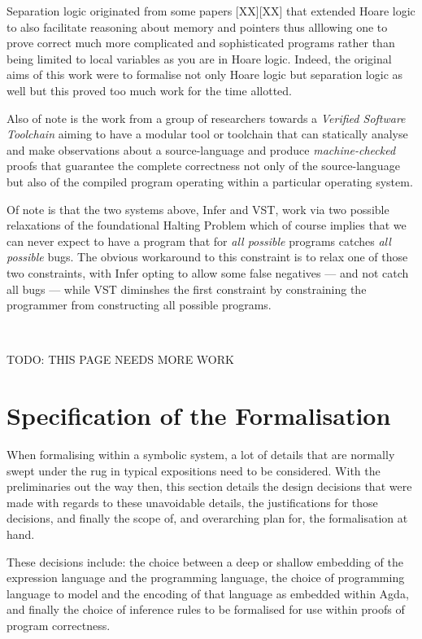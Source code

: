 \documentclass[oneside,12pt]{article}
\begin{document}
Separation logic originated from some papers [XX][XX] that extended Hoare logic to also facilitate reasoning about memory and pointers thus alllowing one to prove correct much more complicated and sophisticated programs rather than being limited to local variables as you are in Hoare logic. Indeed, the original aims of this work were to formalise not only Hoare logic but separation logic as well but this proved too much work for the time allotted.


Also of note is the work from a group of researchers towards a \emph{Verified Software Toolchain}\cite{vst} aiming to have a modular tool or toolchain that can statically analyse and make observations about a source-language and produce \emph{machine-checked} proofs that guarantee the complete correctness not only of the source-language but also of the compiled program operating within a particular operating system.

Of note is that the two systems above, Infer and VST, work via two possible relaxations of the foundational Halting Problem which of course implies that we can never expect to have a program that for \emph{all possible} programs catches \emph{all possible} bugs. The obvious workaround to this constraint is to relax one of those two constraints, with Infer opting to allow some false negatives --- and not catch all bugs --- while VST diminshes the first constraint by constraining the programmer from constructing all possible programs.

\,

TODO: THIS PAGE NEEDS MORE WORK


\pagebreak


\section{Specification of the Formalisation}


When formalising within a symbolic system, a lot of details that are normally swept under the rug in typical expositions need to be considered. With the preliminaries out the way then, this section details the design decisions that were made with regards to these unavoidable details, the justifications for those decisions, and finally the scope of, and overarching plan for, the formalisation at hand.

These decisions include: the choice between a deep or shallow embedding of the expression language and the programming language, the choice of programming language to model and the encoding of that language as embedded within Agda, and finally the choice of inference rules to be formalised for use within proofs of program correctness.
\end{document}
